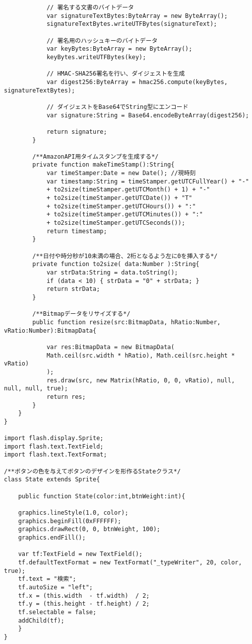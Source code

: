{\begin{verbatim}
			// 署名する文書のバイトデータ
			var signatureTextBytes:ByteArray = new ByteArray();
			signatureTextBytes.writeUTFBytes(signatureText);
			
			// 署名用のハッシュキーのバイトデータ
			var keyBytes:ByteArray = new ByteArray();
			keyBytes.writeUTFBytes(key);
			
			// HMAC-SHA256署名を行い、ダイジェストを生成
			var digest256:ByteArray = hmac256.compute(keyBytes, signatureTextBytes);
			
			// ダイジェストをBase64でString型にエンコード
			var signature:String = Base64.encodeByteArray(digest256);
			
			return signature;
		}
		
		/**AmazonAPI用タイムスタンプを生成する*/
		private function makeTimeStamp():String{
			var timeStamper:Date = new Date(); //現時刻
			var timestamp:String = timeStamper.getUTCFullYear() + "-"
			+ to2size(timeStamper.getUTCMonth() + 1) + "-"
			+ to2size(timeStamper.getUTCDate()) + "T"
			+ to2size(timeStamper.getUTCHours()) + ":"
			+ to2size(timeStamper.getUTCMinutes()) + ":"
			+ to2size(timeStamper.getUTCSeconds());
			return timestamp;
		}
		
		/**日付や時分秒が10未満の場合、2桁となるよう左に0を挿入する*/
		private function to2size( data:Number ):String{
			var strData:String = data.toString();
			if (data < 10) { strData = "0" + strData; }
			return strData;
		}
		
		/**Bitmapデータをリサイズする*/
		public function resize(src:BitmapData, hRatio:Number, vRatio:Number):BitmapData{
			
			var res:BitmapData = new BitmapData(
			Math.ceil(src.width * hRatio), Math.ceil(src.height * vRatio)
			);
			res.draw(src, new Matrix(hRatio, 0, 0, vRatio), null, null, null, true);
			return res;
		}
	}
}

import flash.display.Sprite;
import flash.text.TextField;
import flash.text.TextFormat;

/**ボタンの色を与えてボタンのデザインを形作るStateクラス*/
class State extends Sprite{
	
	public function State(color:int,btnWeight:int){
		
	graphics.lineStyle(1.0, color);
	graphics.beginFill(0xFFFFFF);
	graphics.drawRect(0, 0, btnWeight, 100);
	graphics.endFill();
	 
	var tf:TextField = new TextField();
	tf.defaultTextFormat = new TextFormat("_typeWriter", 20, color, true);
	tf.text = "検索";
	tf.autoSize = "left";
	tf.x = (this.width  - tf.width)  / 2;
	tf.y = (this.height - tf.height) / 2;
	tf.selectable = false;
	addChild(tf);
	}
}
\end{verbatim}
 }


